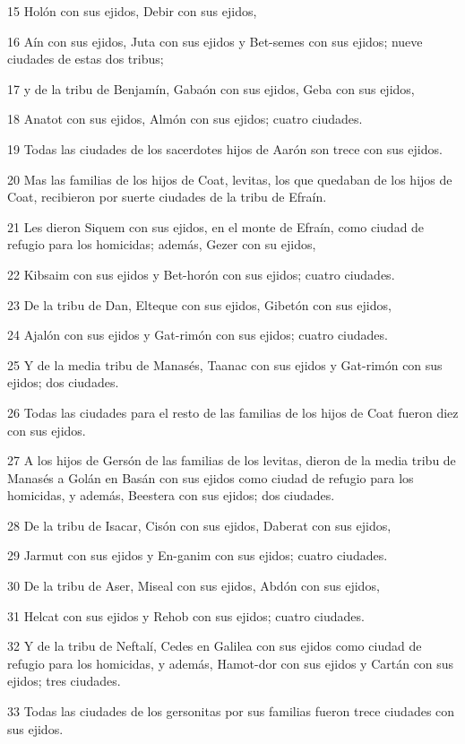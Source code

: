 \par 15 Holón con sus ejidos, Debir con sus ejidos,
\par 16 Aín con sus ejidos, Juta con sus ejidos y Bet-semes con sus ejidos; nueve ciudades de estas dos tribus;
\par 17 y de la tribu de Benjamín, Gabaón con sus ejidos, Geba con sus ejidos,
\par 18 Anatot con sus ejidos, Almón con sus ejidos; cuatro ciudades.
\par 19 Todas las ciudades de los sacerdotes hijos de Aarón son trece con sus ejidos.
\par 20 Mas las familias de los hijos de Coat, levitas, los que quedaban de los hijos de Coat, recibieron por suerte ciudades de la tribu de Efraín.
\par 21 Les dieron Siquem con sus ejidos, en el monte de Efraín, como ciudad de refugio para los homicidas; además, Gezer con su ejidos,
\par 22 Kibsaim con sus ejidos y Bet-horón con sus ejidos; cuatro ciudades.
\par 23 De la tribu de Dan, Elteque con sus ejidos, Gibetón con sus ejidos,
\par 24 Ajalón con sus ejidos y Gat-rimón con sus ejidos; cuatro ciudades.
\par 25 Y de la media tribu de Manasés, Taanac con sus ejidos y Gat-rimón con sus ejidos; dos ciudades.
\par 26 Todas las ciudades para el resto de las familias de los hijos de Coat fueron diez con sus ejidos.
\par 27 A los hijos de Gersón de las familias de los levitas, dieron de la media tribu de Manasés a Golán en Basán con sus ejidos como ciudad de refugio para los homicidas, y además, Beestera con sus ejidos; dos ciudades.
\par 28 De la tribu de Isacar, Cisón con sus ejidos, Daberat con sus ejidos,
\par 29 Jarmut con sus ejidos y En-ganim con sus ejidos; cuatro ciudades.
\par 30 De la tribu de Aser, Miseal con sus ejidos, Abdón con sus ejidos,
\par 31 Helcat con sus ejidos y Rehob con sus ejidos; cuatro ciudades.
\par 32 Y de la tribu de Neftalí, Cedes en Galilea con sus ejidos como ciudad de refugio para los homicidas, y además, Hamot-dor con sus ejidos y Cartán con sus ejidos; tres ciudades.
\par 33 Todas las ciudades de los gersonitas por sus familias fueron trece ciudades con sus ejidos.
